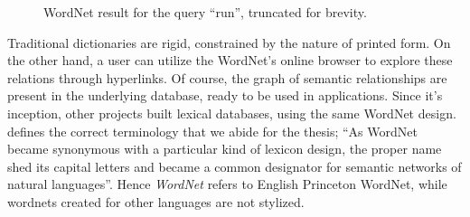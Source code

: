 \begin{figure}[!hbp]
    \begin{center}
        {%
            \setlength{\fboxsep}{1pt}%
            \setlength{\fboxrule}{1pt}%
        }%
        \caption{WordNet result for the query \enquote{run}, truncated for brevity.}\label{fig:example_run}
    \end{center}
\end{figure}
Traditional dictionaries are rigid, constrained by the nature of printed form.
On the other hand, a user can utilize the WordNet's online browser to explore these relations through hyperlinks.
Of course, the graph of semantic relationships are present in the underlying database, ready to be used in applications.
Since it's inception, other projects built lexical databases, using the same WordNet design.
\textcite{fellbaum_semantic_1998} defines the correct terminology that we abide for the thesis; \enquote{As WordNet became synonymous with a particular kind of lexicon design, the proper name shed its capital letters and became a common designator for semantic networks of natural languages}.
Hence \emph{WordNet} refers to English Princeton WordNet, while wordnets created for other languages are not stylized.

